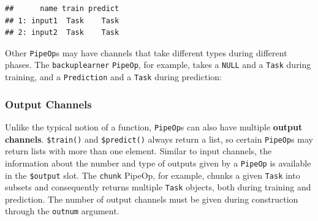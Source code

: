 \documentclass[
]{scrbook}
\newenvironment{Shaded}{\begin{snugshade}}{\end{snugshade}}
\newcommand{\AlertTok}[1]{\textcolor[rgb]{0.94,0.16,0.16}{#1}}
\newcommand{\AttributeTok}[1]{\textcolor[rgb]{0.77,0.63,0.00}{#1}}
\newcommand{\DecValTok}[1]{\textcolor[rgb]{0.00,0.00,0.81}{#1}}
\newcommand{\DocumentationTok}[1]{\textcolor[rgb]{0.56,0.35,0.01}{\textbf{\textit{#1}}}}
\newcommand{\FunctionTok}[1]{\textcolor[rgb]{0.00,0.00,0.00}{#1}}
\newcommand{\NormalTok}[1]{#1}
\newcommand{\SpecialCharTok}[1]{\textcolor[rgb]{0.00,0.00,0.00}{#1}}
\newcommand{\StringTok}[1]{\textcolor[rgb]{0.31,0.60,0.02}{#1}}
\renewenvironment{Shaded} {\begin{snugshade}\small} {\end{snugshade}}
\begin{document}
\begin{Shaded}
\end{Shaded}

\begin{verbatim}
##      name train predict
## 1: input1  Task    Task
## 2: input2  Task    Task
\end{verbatim}

Other \texttt{PipeOp}s may have channels that take different types during different phases.
The \texttt{backuplearner} \texttt{PipeOp}, for example, takes a \texttt{NULL} and a \texttt{Task} during training, and a \texttt{Prediction} and a \texttt{Task} during prediction:

\begin{Shaded}
\end{Shaded}

\hypertarget{output-channels}{%
\subsubsection{Output Channels}\label{output-channels}}

Unlike the typical notion of a function, \texttt{PipeOp}s can also have multiple \textbf{output channels}.
\texttt{\$train()} and \texttt{\$predict()} always return a list, so certain \texttt{PipeOp}s may return lists with more than one element.
Similar to input channels, the information about the number and type of outputs given by a \texttt{PipeOp} is available in the \texttt{\$output} slot.
The \texttt{chunk} PipeOp, for example, chunks a given \texttt{Task} into subsets and consequently returns multiple \texttt{Task} objects, both during training and prediction.
The number of output channels must be given during construction through the \texttt{outnum} argument.

\begin{Shaded}
\end{Shaded}
\end{document}

